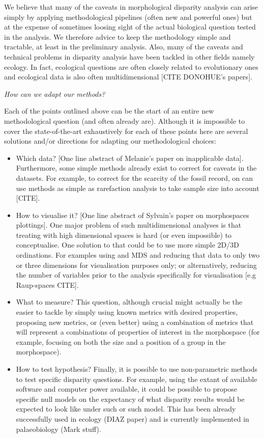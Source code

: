 \documentclass[12pt,letterpaper]{article}
\renewcommand{\subsection}[1]{%
\bigskip
\begin{center}
\begin{large}
\normalfont\itshape #1
\end{large}
\end{center}}
\begin{document}
We believe that many of the caveats in morphological disparity analysis can arise simply by applying methodological pipelines (often new and powerful ones) but at the expense of sometimes loosing sight of the actual biological question tested in the analysis.
We therefore advice to keep the methodology simple and tractable, at least in the preliminary analysis.
Also, many of the caveats and technical problems in disparity analysis have been tackled in other fields namely ecology.
In fact, ecological questions are often closely related to evolutionary ones and ecological data is also often multidimensional [CITE DONOHUE's papers].

\subsection{How can we adapt our methods?}
Each of the points outlined above can be the start of an entire new methodological question (and often already are).
Although it is impossible to cover the state-of-the-art exhaustively for each of these points here are several solutions and/or directions for adapting our methodological choices:

\begin{itemize}
    \item{Which data?}
    [One line abstract of Melanie's paper on inapplicable data].
    Furthermore, some simple methods already exist to correct for caveats in the datasets. 
    For example, to correct for the scarcity of the fossil record, on can use methods as simple as rarefaction analysis to take sample size into account [CITE].
    \item{How to visualise it?}
    [One line abstract of Sylvain's paper on morphospaces plottings].
    One major problem of such multidimensional analyses is that treating with high dimensional spaces is hard (or even impossible) to conceptualise.
    One solution to that could be to use more simple 2D/3D ordinations.
    For examples using and MDS and reducing that data to only two or three dimensions for visualisation purposes only; or alternatively, reducing the number of variables prior to the analysis specifically for visualisation [e.g Raup-spaces CITE].
    \item{What to measure?}
    This question, although crucial might actually be the easier to tackle by simply using known metrics with desired properties, proposing new metrics, or (even better) using a combination of metrics that will represent a combinations of properties of interest in the morphospace (for example, focusing on both the size and a position of a group in the morphospace).
    \item{How to test hypothesis?}
    Finally, it is possible to use non-parametric methods to test specific disparity questions.
    For example, using the extant of available software and computer power available, it could be possible to propose specific null models on the expectancy of what disparity results would be expected to look like under such or such model.
    This has been already successfully used in ecology (DIAZ paper) and is currently implemented in palaeobiology (Mark stuff).
\end{itemize}
\end{document}
